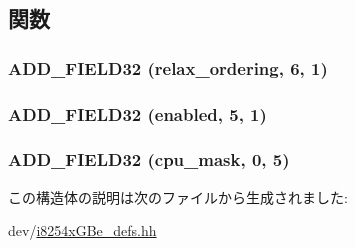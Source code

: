 \subsection{関数}
\hypertarget{structiGbReg_1_1Regs_1_1TXDCA__CTL_ac738ba64621a4d1b1c15b49be7fb2751}{
\subsubsection[{ADD\_\-FIELD32}]{\setlength{\rightskip}{0pt plus 5cm}ADD\_\-FIELD32 (relax\_\-ordering, \/  6, \/  1)}}
\label{structiGbReg_1_1Regs_1_1TXDCA__CTL_ac738ba64621a4d1b1c15b49be7fb2751}
\hypertarget{structiGbReg_1_1Regs_1_1TXDCA__CTL_a272d87d57b586ec07dfdfbcd872fcd21}{
\subsubsection[{ADD\_\-FIELD32}]{\setlength{\rightskip}{0pt plus 5cm}ADD\_\-FIELD32 (enabled, \/  5, \/  1)}}
\label{structiGbReg_1_1Regs_1_1TXDCA__CTL_a272d87d57b586ec07dfdfbcd872fcd21}
\hypertarget{structiGbReg_1_1Regs_1_1TXDCA__CTL_a069ca85e11f7d0b18c82cb943127626f}{
\subsubsection[{ADD\_\-FIELD32}]{\setlength{\rightskip}{0pt plus 5cm}ADD\_\-FIELD32 (cpu\_\-mask, \/  0, \/  5)}}
\label{structiGbReg_1_1Regs_1_1TXDCA__CTL_a069ca85e11f7d0b18c82cb943127626f}


この構造体の説明は次のファイルから生成されました:\begin{DoxyCompactItemize}
\item 
dev/\hyperlink{i8254xGBe__defs_8hh}{i8254xGBe\_\-defs.hh}\end{DoxyCompactItemize}
